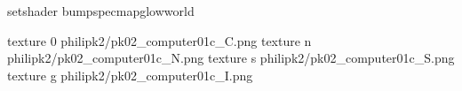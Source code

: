 setshader bumpspecmapglowworld


texture 0 philipk2/pk02_computer01c_C.png
texture n philipk2/pk02_computer01c_N.png
texture s philipk2/pk02_computer01c_S.png
texture g philipk2/pk02_computer01c_I.png

